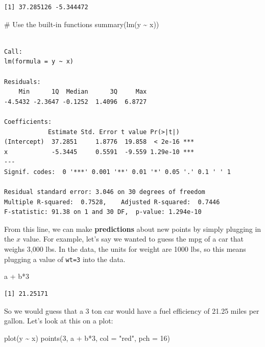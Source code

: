 \documentclass[
  letterpaper,
  DIV=11,
  numbers=noendperiod]{scrreprt}
\newenvironment{Shaded}{\begin{snugshade}}{\end{snugshade}}
\newcommand{\AttributeTok}[1]{\textcolor[rgb]{0.40,0.45,0.13}{#1}}
\newcommand{\CommentTok}[1]{\textcolor[rgb]{0.37,0.37,0.37}{#1}}
\newcommand{\DecValTok}[1]{\textcolor[rgb]{0.68,0.00,0.00}{#1}}
\newcommand{\FunctionTok}[1]{\textcolor[rgb]{0.28,0.35,0.67}{#1}}
\newcommand{\NormalTok}[1]{\textcolor[rgb]{0.00,0.23,0.31}{#1}}
\newcommand{\SpecialCharTok}[1]{\textcolor[rgb]{0.37,0.37,0.37}{#1}}
\newcommand{\StringTok}[1]{\textcolor[rgb]{0.13,0.47,0.30}{#1}}
\begin{document}
\begin{verbatim}
[1] 37.285126 -5.344472
\end{verbatim}

\begin{Shaded}
\begin{Highlighting}[]
\CommentTok{\# Use the built{-}in functions}
\FunctionTok{summary}\NormalTok{(}\FunctionTok{lm}\NormalTok{(y }\SpecialCharTok{\textasciitilde{}}\NormalTok{ x))}
\end{Highlighting}
\end{Shaded}

\begin{verbatim}

Call:
lm(formula = y ~ x)

Residuals:
    Min      1Q  Median      3Q     Max 
-4.5432 -2.3647 -0.1252  1.4096  6.8727 

Coefficients:
            Estimate Std. Error t value Pr(>|t|)    
(Intercept)  37.2851     1.8776  19.858  < 2e-16 ***
x            -5.3445     0.5591  -9.559 1.29e-10 ***
---
Signif. codes:  0 '***' 0.001 '**' 0.01 '*' 0.05 '.' 0.1 ' ' 1

Residual standard error: 3.046 on 30 degrees of freedom
Multiple R-squared:  0.7528,    Adjusted R-squared:  0.7446 
F-statistic: 91.38 on 1 and 30 DF,  p-value: 1.294e-10
\end{verbatim}

From this line, we can make \textbf{predictions} about new points by
simply plugging in the \(x\) value. For example, let's say we wanted to
guess the mpg of a car that weighs 3,000 lbs. In the data, the units for
weight are 1000 lbs, so this means plugging a value of \texttt{wt=3}
into the data.

\begin{Shaded}
\begin{Highlighting}[]
\NormalTok{a }\SpecialCharTok{+}\NormalTok{ b}\SpecialCharTok{*}\DecValTok{3}
\end{Highlighting}
\end{Shaded}

\begin{verbatim}
[1] 21.25171
\end{verbatim}

So we would guess that a 3 ton car would have a fuel efficiency of 21.25
miles per gallon. Let's look at this on a plot:

\begin{Shaded}
\begin{Highlighting}[]
\FunctionTok{plot}\NormalTok{(y }\SpecialCharTok{\textasciitilde{}}\NormalTok{ x)}
\FunctionTok{points}\NormalTok{(}\DecValTok{3}\NormalTok{, a }\SpecialCharTok{+}\NormalTok{ b}\SpecialCharTok{*}\DecValTok{3}\NormalTok{, }\AttributeTok{col =} \StringTok{"red"}\NormalTok{, }\AttributeTok{pch =} \DecValTok{16}\NormalTok{)}
\end{Highlighting}
\end{Shaded}
\end{document}
